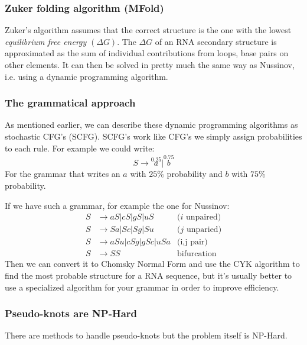     \subsubsection{Zuker folding algorithm (MFold)}
    Zuker's algorithm assumes that the correct structure is the one with the 
    lowest \textit{equilibrium free energy} $(\Delta G)$.
    The $\Delta G$ of an RNA secondary structure is approximated as the sum of 
    individual contributions from loops, base pairs on other elements. It can 
    then be solved in pretty much the same way as Nussinov, i.e. using a 
    dynamic programming algorithm.
    
    \subsubsection{The grammatical approach}
    As mentioned earlier, we can describe these dynamic programming algorithms 
    as stochastic CFG's (SCFG). SCFG's work like CFG's we simply assign 
    probabilities to each rule. For example we could write:
    \begin{equation*}
        S \rightarrow \overset{0.25}{a}|\overset{0.75}{b}
    \end{equation*}
    For the grammar that writes an $a$ with $25\%$ probability and $b$ with 
    $75\%$ probability.
    
    If we have such a grammar, for example the one for Nussinov: 
    \begin{align*}
        S &\rightarrow aS|cS|gS|uS &\text{($i$ unpaired)}\\
        S &\rightarrow Sa|Sc|Sg|Su &\text{($j$ unparied)}\\
        S &\rightarrow aSu|cSg|gSc|uSa &\text{(i,j pair)}\\
        S &\rightarrow SS &\text{bifurcation}
    \end{align*}
    Then we can convert it to Chomsky Normal Form and use the CYK algorithm to 
    find the most probable structure for a RNA sequence, but it's usually 
    better to use a specialized algorithm for your grammar in order to improve 
    efficiency.
    
    \subsubsection{Pseudo-knots are NP-Hard}
    There are methods to handle pseudo-knots but the problem itself is NP-Hard.
